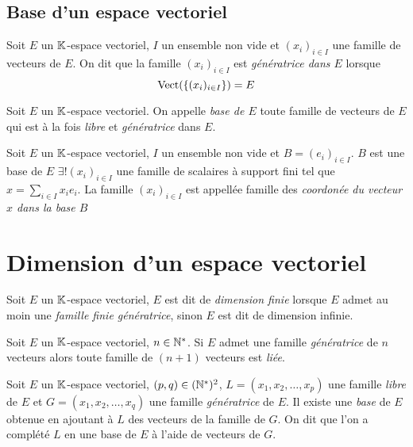 \subsection{Base d'un espace vectoriel}

\begin{dfn}
Soit $E$ un $\mathbb{K}$-espace vectoriel, $I$ un ensemble non vide et
$(x_i)_{i \in I}$ une famille de vecteurs de $E$. On dit que la famille
$(x_i)_{i \in I}$ est \emph{génératrice dans $E$} lorsque
\[
    \operatorname{Vect}(\left\{(x_i)_{i \in I}\right\}) = E
\]
\end{dfn}

\begin{dfn}[Base]
Soit $E$ un $\mathbb{K}$-espace vectoriel. On appelle \emph{base de $E$} toute
famille de vecteurs de $E$ qui est à la fois \emph{libre} et
\emph{génératrice} dans $E$.
\end{dfn}

\begin{prp}
Soit $E$ un $\mathbb{K}$-espace vectoriel, $I$ un ensemble non vide et
$B = (e_i)_{i \in I}$. $B$ est une base de $E$ \ssi $\exists!
(x_i)_{i \in I}$ une famille de scalaires à support fini tel que
$x = \sum_{i \in I} x_i e_i$.
La famille $(x_i)_{i \in I}$ est appellée famille des \emph{coordonée
du vecteur $x$ dans la base $B$}
\end{prp}


\section{Dimension d'un espace vectoriel}

\begin{dfn}
Soit $E$ un $\mathbb{K}$-espace vectoriel, $E$ est dit de \emph{dimension finie}
lorsque $E$ admet au moin une \emph{famille finie génératrice}, sinon
$E$ est dit de dimension infinie.
\end{dfn}

\begin{thm}
Soit $E$ un $\mathbb{K}$-espace vectoriel, $n \in \mathbb{N}^*$. Si $E$ admet une famille
\emph{génératrice} de $n$ vecteurs alors toute famille de $(n + 1)$
vecteurs est \emph{liée}.
\end{thm}

\begin{thm}
Soit $E$ un $\mathbb{K}$-espace vectoriel, $(p, q) \in (\mathbb{N}^*)^2$,
$L = (x_1, x_2, \ldots, x_p)$ une famille \emph{libre} de $E$ et
$G = (x_1, x_2, \ldots, x_q)$ une famille \emph{génératrice} de $E$.
Il existe une \emph{base} de $E$ obtenue en ajoutant à $L$ des vecteurs
de la famille de $G$. On dit que l'on a complété $L$ en une base de $E$
à l'aide de vecteurs de $G$.
\end{thm}


